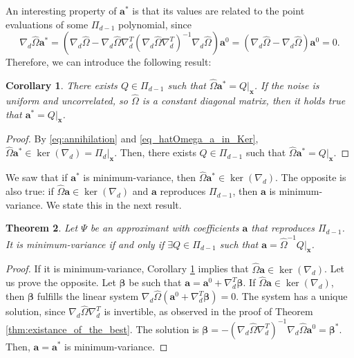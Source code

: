 \documentclass[preprint]{elsarticle}       %
\newcommand{\ba}{\bm{a}}
\newcommand{\bx}{\bm{x}}
\newcommand{\bbeta}{\bm{\beta}}
\newcommand{\dif}{\nabla_d}
\theoremstyle{plain}
\newtheorem{thm}{Theorem}
\newtheorem{cor}[thm]{Corollary}
\theoremstyle{remark}
\begin{document}
An interesting property of $\ba^*$ is that its values are related to the point evaluations of some $\Pi_{d-1}$ polynomial, since
\begin{equation} \label{eq_hatOmega_a_in_Ker}
	\dif \hat \Omega \ba^* = (\dif \hat \Omega - \dif \hat \Omega \dif^T (\dif \hat \Omega \dif^T)^{-1} \dif \hat \Omega) \ba^0 = (\dif\hat \Omega - \dif\hat \Omega) \ba^0 = 0.
\end{equation}
Therefore, we can introduce the following result:
\begin{cor} \label{cor:rule_is_poly}
	There exists $Q\in\Pi_{d-1}$ such that $ \hat \Omega \ba^* = Q|_{\bx}$.
	If the noise is uniform and uncorrelated, so $\hat \Omega$ is a constant diagonal matrix, then it holds true that $ \ba^* = Q|_{\bx}$.
\end{cor}
\begin{proof}
	By \eqref{eq:annihilation} and \eqref{eq_hatOmega_a_in_Ker}, $\hat \Omega \ba^* \in \ker(\nabla_d) = \Pi_d|_{\bx}$. Then, there exists $Q\in\Pi_{d-1}$ such that $ \hat \Omega \ba^* = Q|_{\bx}$.
\end{proof}

We saw that if $\ba^*$ is minimum-variance, then $\hat \Omega \ba^* \in \ker(\nabla_d)$. The opposite is also true: if $\hat \Omega \ba \in \ker(\nabla_d)$ and $\ba$ reproduces $\Pi_{d-1}$, then $\ba$ is minimum-variance. We state this in the next result.

\begin{thm} \label{thm:caracterization_of_optimal}
	Let $\Psi$ be an approximant with coefficients $\ba$ that reproduces $\Pi_{d-1}$. It is minimum-variance if and only if $\exists Q\in\Pi_{d-1}$ such that $\ba = \hat \Omega^{-1} Q|_{\bx}$.
\end{thm}
\begin{proof}
	If it is minimum-variance, Corollary \ref{cor:rule_is_poly} implies that $\hat \Omega \ba \in \ker(\nabla_d)$. Let us prove the opposite. Let $\bbeta$ be such that $\ba = \ba^0 + \dif^T \bbeta$. If $\hat \Omega \ba \in \ker(\nabla_d)$, then $\bbeta$ fulfills the linear system $\dif \hat \Omega ( \ba^0 + \dif^T \bbeta )=0.$ The system has a unique solution, since $\dif \hat \Omega \dif^T$ is invertible, as observed in the proof of Theorem \ref{thm:existance_of_the_best}. The solution is $\bbeta = - (\dif \hat \Omega \dif^T)^{-1} \dif \hat \Omega \ba^0 = \bbeta^*$. Then, $\ba = \ba^*$ is minimum-variance.
\end{proof}
\end{document}
